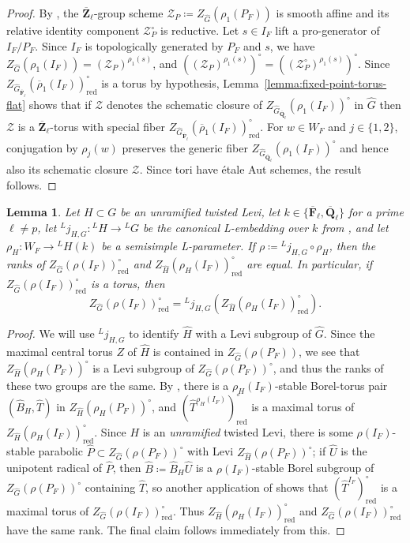 \documentclass[reqno]{amsart}
\numberwithin{equation}{subsection}
\newcommand{\F}{\mathbf{F}}
\newcommand{\Q}{\mathbf{Q}}
\newcommand{\Z}{\mathbf{Z}}
\newcommand{\ol}[1]{\overline{#1}}
\newcommand{\wh}[1]{\widehat{#1}}
\newcommand{\co}{\colon}
\newcommand{\ld}{{}^L}
\newcommand\cZ{\mathcal{Z}}
\DeclareMathOperator{\red}{red}
\newtheorem{lemma}[thm]{Lemma}
\theoremstyle{remark}
\numberwithin{equation}{subsection}
\numberwithin{figure}{subsection}
\begin{document}
\begin{proof}
By \cite[Corollary 3.7]{BCT24}, the $\ol\Z_\ell$-group scheme $\cZ_P \coloneqq Z_{\wh G}(\rho_1(P_F))$ is smooth affine and its relative identity component $\cZ_P^\circ$ is reductive. Let $s \in I_F$ lift a pro-generator of $I_F/P_F$. Since $I_F$ is topologically generated by $P_F$ and $s$, we have $Z_{\wh G}(\rho_1(I_F)) = (\cZ_P)^{\rho_1(s)}$, and $((\cZ_P)^{\rho_1(s)})^\circ = ((\cZ_P^\circ)^{\rho_1(s)})^\circ$.
Since $Z_{\wh G_{\ol\F_\ell}}(\ol\rho_1(I_F))^\circ_{\red}$ is a torus by hypothesis, Lemma~\ref{lemma:fixed-point-torus-flat} shows that if $\cZ$ denotes the schematic closure of $Z_{\wh G_{\ol\Q_\ell}}(\rho_1(I_F))^\circ$ in $\wh G$ then $\cZ$ is a $\ol\Z_\ell$-torus with special fiber $Z_{\wh G_{\ol\F_\ell}}(\ol\rho_1(I_F))^\circ_{\red}$.
For $w \in W_F$ and $j \in \{1,2\}$, conjugation by $\rho_j(w)$ preserves the generic fiber $Z_{\wh G_{\ol\Q_\ell}}(\rho_1(I_F))^\circ$ and hence also its schematic closure $\cZ$. Since tori have \'etale Aut schemes, the result follows.
\end{proof}

\begin{lemma}\label{lemma:toral-l-parameter-centralizer}
Let $H \subset G$ be an unramified twisted Levi, let $k \in \{\ol\F_\ell, \ol\Q_\ell\}$ for a prime $\ell \neq p$, let $\ld j_{H,G}\co \ld H \to \ld G$ be the canonical L-embedding over $k$ from \cite[Definition~4.5.1]{CF26a}, and let $\rho_H\co W_F \to \ld H(k)$ be a semisimple L-parameter. If $\rho \coloneqq \ld j_{H,G} \circ \rho_H$, then the ranks of $Z_{\wh G}(\rho(I_F))^\circ_{\red}$ and $Z_{\wh H}(\rho_H(I_F))^\circ_{\red}$ are equal. In particular, if $Z_{\wh G}(\rho(I_F))^\circ_{\red}$ is a torus, then
\[
Z_{\wh G}(\rho(I_F))^\circ_{\red} = \ld j_{H,G}(Z_{\wh H}(\rho_H(I_F))^\circ_{\red}).
\]
\end{lemma}

\begin{proof}
We will use $\ld j_{H,G}$ to identify $\wh H$ with a Levi subgroup of $\wh G$. Since the maximal central torus $Z$ of $\wh H$ is contained in $Z_{\wh G}(\rho(P_F))$, we see that $Z_{\wh H}(\rho_H(P_F))^\circ$ is a Levi subgroup of $Z_{\wh G}(\rho(P_F))^\circ$, and thus the ranks of these two groups are the same. By \cite[Lemma~10.1.10]{CF26a}, there is a $\rho_H(I_F)$-stable Borel-torus pair $(\wh B_H, \wh T)$ in $Z_{\wh H}(\rho_H(P_F))^\circ$, and $(\wh T^{\rho_H(I_F)})^\circ_{\red}$ is a maximal torus of $Z_{\wh H}(\rho_H(I_F))^\circ_{\red}$. Since $H$ is an \emph{unramified} twisted Levi, there is some $\rho(I_F)$-stable parabolic $\wh P \subset Z_{\wh G}(\rho(P_F))^\circ$ with Levi $Z_{\wh H}(\rho(P_F))^\circ$; if $\wh U$ is the unipotent radical of $\wh P$, then $\wh B \coloneqq \wh B_H \wh U$ is a $\rho(I_F)$-stable Borel subgroup of $Z_{\wh G}(\rho(P_F))^\circ$ containing $\wh T$, so another application of \cite[Lemma~10.1.10]{CF26a} shows that $(\wh T^{I_F})^\circ_{\red}$ is a maximal torus of $Z_{\wh G}(\rho(I_F))^\circ_{\red}$. Thus $Z_{\wh H}(\rho_H(I_F))^\circ_{\red}$ and $Z_{\wh G}(\rho(I_F))^\circ_{\red}$ have the same rank. The final claim follows immediately from this.
\end{proof}
\end{document}
